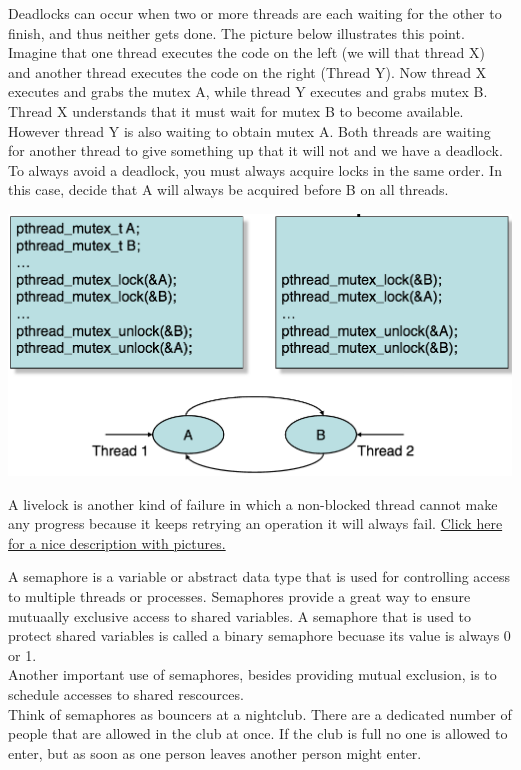 Deadlocks can occur when two or more threads are each waiting for the other to finish, and thus neither gets done.  The picture below illustrates this point.  Imagine that one thread executes the code on the left (we will that thread X) and another thread executes the code on the right (Thread Y).  Now thread X executes and grabs the mutex A, while thread Y executes and grabs mutex B.  Thread X understands that it must wait for  mutex B to become available.  However thread Y is also waiting to obtain mutex A.  Both threads are waiting for another thread to give something up that it will not and we have a deadlock.  To always avoid a deadlock, you must always acquire locks in the same order.  In this case, decide that A will always be acquired before B on all threads.

\begin{center} %
    \includegraphics[scale=0.5]{threads/deadlock.png}
\end{center}

A livelock is another kind of failure in which a non-blocked thread cannot make any progress because it keeps retrying an operation it will always fail.
\href{http://www.guruzon.com/1/threading/multithreading-concepts/what-is-live-lock
}{Click here for a nice description with pictures.}




A semaphore is a variable or abstract data type that is used for controlling access to multiple threads or processes.  Semaphores provide a great way to ensure mutuaally exclusive access to shared variables.  A semaphore that is used to protect shared variables is called a binary semaphore becuase its value is always 0 or 1.\\

Another important use of semaphores, besides providing mutual exclusion, is to schedule accesses to shared rescources.\\

Think of semaphores as bouncers at a nightclub. There are a dedicated number of people that are allowed in the club at once. If the club is full no one is allowed to enter, but as soon as one person leaves another person might enter.
